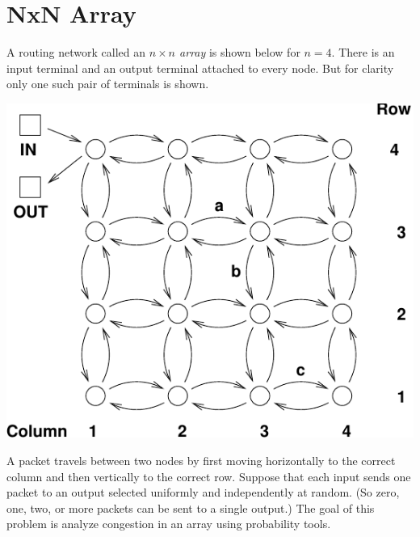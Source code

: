 \documentclass[12pt]{article}
\begin{document}

\newpage

\section{NxN Array}
A routing network called an \textit{$n \times n$ array} is shown below
for $n = 4$.  There is an input terminal and an output terminal
attached to every node.  But for clarity only one such pair of
terminals is shown.
%
\begin{center}
\includegraphics{2darray}
\end{center}
%
A packet travels between two nodes by first moving horizontally to the
correct column and then vertically to the correct row.  Suppose that
each input sends one packet to an output selected uniformly and
independently at random.  (So zero, one, two, or more packets can be
sent to a single output.)  The goal of this problem is analyze
congestion in an array using probability tools.
\end{document}

